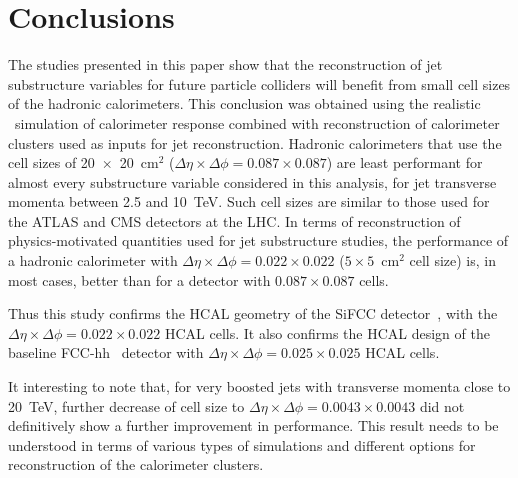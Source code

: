 \section{Conclusions}
The studies presented in this paper show that the reconstruction of jet substructure 
variables for future particle colliders will benefit from small cell sizes of the hadronic calorimeters. 
This conclusion was obtained using the realistic \GEANTfour\ simulation of calorimeter response combined with reconstruction of 
calorimeter clusters used as inputs for jet reconstruction. 
Hadronic calorimeters that use the cell sizes of 20~$\times $~20~cm$^2$ ($\Delta \eta \times \Delta \phi = 0.087\times 0.087$) 
are least performant for almost every 
substructure variable considered in this analysis, for jet transverse momenta between 2.5 and 10~TeV. 
Such cell sizes are similar to 
those used for the ATLAS and CMS detectors at the LHC. 
In terms of reconstruction of physics-motivated quantities  
used for jet substructure studies, the  performance 
of a  hadronic calorimeter  with 
$\Delta \eta \times \Delta \phi = 0.022\times0.022$ ($5 \times 5$~$\mathrm{cm}^2$ cell size) is, in most cases,
better than for a detector with  $0.087\times 0.087$ cells.

Thus this study confirms the  HCAL geometry of the SiFCC detector~\cite{Chekanov:2016ppq},
with the $\Delta \eta \times \Delta \phi = 0.022\times0.022$ HCAL cells.
It also confirms the HCAL design of the baseline FCC-hh~\cite{fcc1,fcc2} detector with
$\Delta \eta \times \Delta \phi = 0.025\times0.025$ HCAL cells.

It interesting to note that,  for very boosted jets with transverse momenta close to 20~TeV, further decrease of cell size to $\Delta \eta \times \Delta \phi = 0.0043\times0.0043$ did not 
 definitively show a further improvement in performance. 
 This result needs to be understood in terms of various types of simulations and 
different options for reconstruction of the calorimeter clusters.
